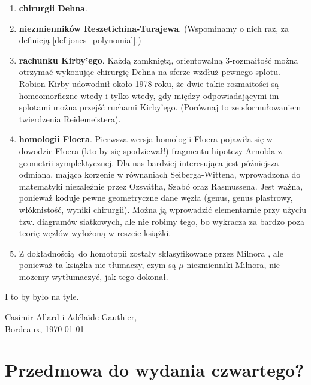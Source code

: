 \begin{enumerate}
    \item \textbf{chirurgii Dehna}.
    \item \textbf{niezmienników Reszetichina-Turajewa}.
    (Wspominamy o nich raz, za definicją \ref{def:jones_polynomial}.)
    \item \textbf{rachunku Kirby'ego}.
    Każdą zamkniętą, orientowalną 3-rozmaitość można otrzymać wykonując chirurgię Dehna na sferze wzdłuż pewnego splotu. Robion Kirby udowodnił około 1978 roku, że dwie takie rozmaitości są homeomorficzne wtedy i tylko wtedy, gdy między odpowiadającymi im splotami można przejść ruchami Kirby'ego.
    (Porównaj to ze sformułowaniem twierdzenia Reidemeistera).
    \item \textbf{homologii Floera}.
    Pierwsza wersja homologii Floera pojawiła się w dowodzie Floera (kto by się spodziewał!) fragmentu hipotezy Arnolda z geometrii symplektycznej.
    Dla nas bardziej interesująca jest późniejsza odmiana, mająca korzenie w równaniach Seiberga-Wittena, wprowadzona do matematyki niezależnie przez Ozsvátha, Szabó oraz Rasmussena.
    Jest ważna, ponieważ koduje pewne geometryczne dane węzła (genus, genus plastrowy, włóknistość, wyniki chirurgii).
    Można ją wprowadzić elementarnie przy użyciu tzw. diagramów siatkowych, ale nie robimy tego, bo wykracza za bardzo poza teorię węzłów wyłożoną w reszcie książki.
    \item Z dokładnością do homotopii zostały sklasyfikowane przez Milnora \cite{milnor1954}, ale ponieważ ta książka nie tłumaczy, czym są $\mu$-niezmienniki Milnora, nie możemy wytłumaczyć, jak tego dokonał.
\end{enumerate}
I to by było na tyle.
\begin{flushright}
    Casimir Allard i Adélaïde Gauthier,\\Bordeaux, \today
\end{flushright}

\section*{Przedmowa do wydania czwartego?}

